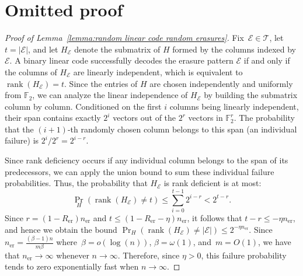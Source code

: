 \documentclass[journal,letterpaper,onecolumn,11pt]{IEEEtran}
\newcommand{\cE}{\mathcal{E}}
\newcommand{\cT}{\mathcal{T}}
\newcommand{\rank}{\operatorname{rank}}
\begin{document}
\section{Omitted proof}\label{appendix}
\begin{proof}[Proof of Lemma~\ref{lemma:random linear code random erasures}]
Fix~$\cE\in\cT$, let~$t=|\cE|$,
and let $H_\cE$ denote the submatrix of $H$ formed by the columns indexed by $\cE$. 
A binary linear code successfully decodes the erasure pattern $\cE$ if and only if the columns of $H_\cE$ are linearly independent, which is equivalent to $\rank(H_\cE) = t$. 
Since the entries of $H$ are chosen independently and uniformly from $\mathbb{F}_2$, we can analyze the linear independence of $H_\cE$ by building the submatrix column by column.
Conditioned on the first $i$ columns being linearly independent, their span contains exactly $2^i$ vectors out of the $2^r$ vectors in $\mathbb{F}_2^r$. 
The probability that the $(i+1)$-th randomly chosen column belongs to this span (an individual failure) is $2^i / 2^r = 2^{i-r}$. 

Since rank deficiency occurs if any individual column belongs to the span of its predecessors, we can apply the union bound to sum these individual failure probabilities. 
Thus, the probability that $H_\cE$ is rank deficient is at most:
$$ \Pr_H(\rank(H_\cE) \ne t) \le \sum_{i=0}^{t-1}2^{i-r} < 2^{t-r}. $$
Since $r=(1-R_{\mathrm{er}})n_{\mathrm{er}}$ and $t\le(1-R_{\mathrm{er}}-\eta)n_{\mathrm{er}}$, it follows that $t-r \le -\eta n_{\mathrm{er}}$, and hence we obtain the bound $\Pr_H(\rank(H_\cE) \ne |\cE|) \le 2^{-\eta n_{\mathrm{er}}}$. 
Since $n_{\mathrm{er}} = \frac{(\beta-1)n}{m\beta}$ where~$\beta=o(\log(n))$, $\beta=\omega(1)$, and~$m=O(1)$, we have that $n_{\mathrm{er}}\to\infty$ whenever $n\to\infty$. 
Therefore, since $\eta > 0$, this failure probability tends to zero exponentially fast when $n\to\infty$.
\end{proof}
\end{document}
